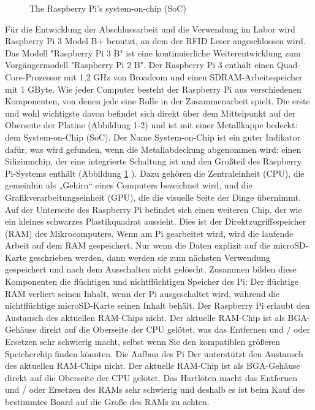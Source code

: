 \begin{figure}
	\caption{The Raspberry Pi’s system-on-chip (SoC)}
	\label{fig:rasp_soc}
\end{figure}

Für die Entwicklung der Abschlussarbeit und die Verwendung im Labor wird Raspberry Pi 3 Model B+ benutzt, an dem der RFID Leser angeschlossen wird. Das Modell "Raspberry Pi 3 B" ist eine kontinuierliche Weiterentwicklung zum Vorgängermodell "Raspberry Pi 2 B".
Der Raspberry Pi 3 enthält einen Quad-Core-Prozessor mit 1,2 GHz von Broadcom und einen SDRAM-Arbeitsspeicher mit 1 GByte. Wie jeder Computer besteht der Raspberry Pi aus verschiedenen Komponenten, von denen jede eine Rolle in der Zusammenarbeit spielt. Die erste und wohl wichtigste davon befindet sich direkt über dem Mittelpunkt auf der Oberseite der Platine (Abbildung 1-2) und ist mit einer Metallkappe bedeckt: dem System-on-Chip (SoC). Der Name System-on-Chip ist ein guter Indikator dafür, was wird gefunden, wenn die Metallabdeckung abgenommen wird: einen Siliziumchip, der eine integrierte Schaltung ist und den Großteil des Raspberry Pi-Systems enthält (Abbildung \ref{fig:rasp_soc} \cite[p. 10]{gareth:raspi}). Dazu gehören die Zentraleinheit (CPU), die gemeinhin als „Gehirn“ eines Computers bezeichnet wird, und die Grafikverarbeitungseinheit (GPU), die die visuelle Seite der Dinge übernimmt.\cite[p. 11]{gareth:raspi} Auf der Unterseite des Raspberry Pi befindet sich einen weiteren Chip, der wie ein kleines schwarzes Plastikquadrat aussieht. Dies ist der Direktzugriffsspeicher (RAM) des Mikrocomputers. Wenn am Pi gearbeitet wird, wird die laufende Arbeit auf dem RAM gespeichert. Nur wenn die Daten explizit auf die microSD-Karte geschrieben werden, dann werden sie zum nächsten Verwendung gespeichert und nach dem Ausschalten nicht gelöscht. Zusammen bilden diese Komponenten die flüchtigen und nichtflüchtigen Speicher des Pi: Der flüchtige RAM verliert seinen Inhalt, wenn der Pi ausgeschaltet wird, während die nichtflüchtige microSD-Karte seinen Inhalt behält. Der Raspberry Pi  erlaubt den Austausch des aktuellen RAM-Chips nicht. Der aktuelle RAM-Chip ist als BGA-Gehäuse direkt auf die Oberseite der CPU gelötet, was das Entfernen und / oder Ersetzen sehr schwierig macht, selbst wenn Sie den kompatiblen größeren Speicherchip finden könnten. Die Aufbau des Pi Der unterstützt den Austausch des aktuellen RAM-Chips nicht. Der aktuelle RAM-Chip ist als BGA-Gehäuse direkt auf die Oberseite der CPU gelötet. Das Hartlöten macht das Entfernen und / oder Ersetzen des RAMs sehr schwierig und deshalb es ist beim Kauf des bestimmtes Board auf die Große des RAMs zu achten.

